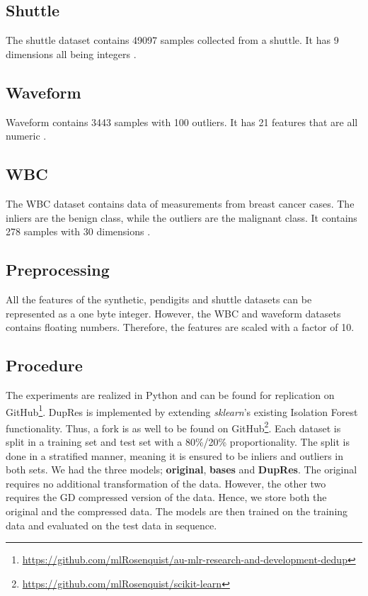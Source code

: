 \subsection*{Shuttle}
The shuttle dataset contains 49097 samples collected from a shuttle. It has 9 dimensions all being integers \cite{ODDS}.

\subsection*{Waveform}
Waveform contains 3443 samples with 100 outliers. It has 21 features that are all numeric \cite{waveform}.

\subsection*{WBC}
The WBC dataset contains data of measurements from breast cancer cases. The inliers are the benign class, while the outliers are the malignant class. It contains 278 samples with 30 dimensions \cite{ODDS}.

\subsection{Preprocessing}
All the features of the synthetic, pendigits and shuttle datasets can be represented as a one byte integer. However, the WBC and waveform datasets contains floating numbers. Therefore, the features are scaled with a factor of 10.

\subsection{Procedure}
The experiments are realized in Python and can be found for replication on GitHub\footnote{\href{https://github.com/mlRosenquist/au-mlr-research-and-development-dedup}{https://github.com/mlRosenquist/au-mlr-research-and-development-dedup}}. DupRes is implemented by extending \textit{sklearn}'s existing Isolation Forest functionality. Thus, a fork is as well to be found on GitHub\footnote{\href{https://github.com/mlRosenquist/scikit-learn}{https://github.com/mlRosenquist/scikit-learn}}.
Each dataset is split in a training set and test set with a 80\%/20\% proportionality. The split is done in a stratified manner, meaning it is ensured to be inliers and outliers in both sets. We had the three models; \textbf{original}, \textbf{bases} and \textbf{DupRes}. The original requires no additional transformation of the data. However, the other two requires the GD compressed version of the data. Hence, we store both the original and the compressed data. The models are then trained on the training data and evaluated on the test data in sequence.

